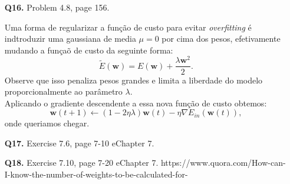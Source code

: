 \documentclass[12pt]{article}
\begin{document}
\begin{enumerate}
\begin{addmargin}[1em]{2em}
\begin{align*}
		\end{align*}
		\begin{itemize}
			\item[a)] Queremos $\nabla E_{in}(\mathbf{w}) = 0$, então, da expressão acima o valor de \textbf{w} que minimiza $E_{in}$ é $\mathbf{w_{lin}}$.
			\item[b)] O menor $E_{in}$ ocorre quando $\mathbf{w_{lin}} = (Z^TZ)^{-1}Z^Ty$.
		\end{itemize}
	\end{addmargin}
\item [\textbf{Q16.}] Problem 4.8, page 156.
	\begin{addmargin}[1em]{2em}
		Uma forma de regularizar a função de custo para evitar \textit{overfitting} é indtroduzir uma gaussiana de media $\mu = 0$ por cima dos pesos, efetivamente mudando a funçaõ de custo da seguinte forma: \[\tilde{E}(\mathbf{w}) = E(\mathbf{w}) + \frac{\lambda \mathbf{w}^2}{2}.\]
		Observe que isso penaliza pesos grandes e limita a liberdade do modelo proporcionalmente ao parâmetro $\lambda$.\\
		Aplicando o gradiente descendente a essa nova função de custo obtemos: \[\mathbf{w}(t+1) \leftarrow (1-2\eta \lambda)\mathbf{w}(t) - \eta \nabla E_{in}(\mathbf{w}(t)),\]
		onde queriamos chegar.
	\end{addmargin}
\item [\textbf{Q17.}] Exercise 7.6, page 7-10 eChapter 7.
	
\item [\textbf{Q18.}] Exercise 7.10, page 7-20 eChapter 7.
https://www.quora.com/How-can-I-know-the-number-of-weights-to-be-calculated-for-%
\end{enumerate}
\end{document}
